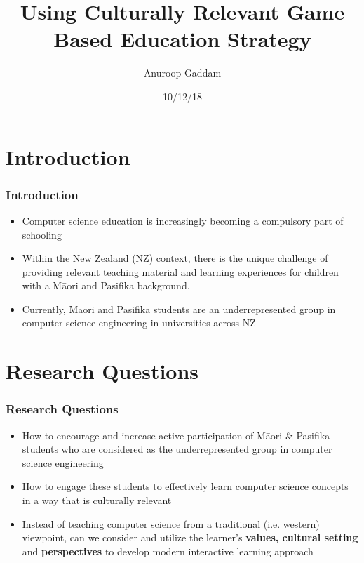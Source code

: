 \documentclass[aspectratio=169]{beamer}
\title{Using Culturally Relevant Game Based Education Strategy}
\author{Anuroop Gaddam }
\date{10/12/18}
\institute{School of Engineering \& Computer Science \\
Victoria University of Wellington, New Zealand\\
\url{Anuroop.Gaddam@vuw.ac.nz}}
\begin{document}
\begin{frame}[plain,t]
\titlepage
\end{frame}


\section{Introduction}
\begin{frame}
\frametitle{Introduction}
\begin{itemize}
\item Computer science education is increasingly becoming a compulsory part of schooling
	\newline
\item Within the New Zealand (NZ) context, there is the unique challenge of providing relevant teaching material and learning experiences for children with a M\=aori and Pasifika background.
	\newline
\item Currently, M\=aori and Pasifika students are an underrepresented group in computer science engineering in universities across NZ
\end{itemize}
\end{frame}

\section{Research Questions}
\begin{frame}
\frametitle{Research Questions}
\begin{itemize}
\item How to encourage and increase active participation of M\=aori \& Pasifika students who are considered as the underrepresented group in computer science engineering
	\newline
\item How to engage these students to effectively learn computer science concepts in a way that is culturally relevant
	\newline
\item Instead of teaching computer science from a traditional (i.e. western) viewpoint, can we consider and utilize the learner’s \textbf{values, cultural setting} and \textbf{perspectives} to develop modern interactive learning approach
	
\end{itemize}
\end{frame}
\end{document}
